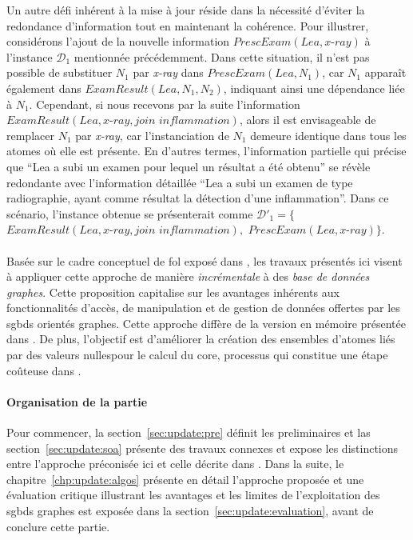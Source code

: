Un autre défi inhérent à la mise à jour réside dans la nécessité d'éviter la redondance d'information tout en maintenant la cohérence.
Pour illustrer, considérons l'ajout de la nouvelle information $PrescExam(Lea, \textit{x-ray})$ à l'instance $\mathcal{D}_1$ mentionnée précédemment.
Dans cette situation, il n'est pas possible de substituer $N_1$ par \textit{x-ray} dans $PrescExam(Lea, N_1)$, car $N_1$ apparaît également dans $ExamResult(Lea, N_1, N_2)$, indiquant ainsi une dépendance liée à $N_1$.
Cependant, si nous recevons par la suite l'information $ExamResult(Lea, \textit{x-ray}, \textit{join inflammation})$, alors il est envisageable de remplacer $N_1$ par \textit{x-ray}, car l'instanciation de $N_1$ demeure identique dans tous les atomes où elle est présente.
En d'autres termes, l'information partielle qui précise que \enquote{Lea a subi un examen pour lequel un résultat a été obtenu} se révèle redondante avec l'information détaillée \enquote{Lea a subi un examen de type radiographie, ayant comme résultat la détection d'une inflammation}.
Dans ce scénario, l'instance obtenue se présenterait comme $\mathcal{D}'_1 = \{$$ExamResult(Lea, \textit{x-ray}, \textit{join inflammation}),$ $PrescExam(Lea, \textit{x-ray})\}$.

\paragraph{}
Basée sur le cadre conceptuel de \gls{fol} exposé dans \cite{chabinConsistentUpdatingDatabases2020}, les travaux présentés ici visent à appliquer cette approche de manière \emph{incrémentale} à des \emph{base de données graphes}.
Cette proposition capitalise sur les avantages inhérents aux fonctionnalités d'accès, de manipulation et de gestion de données offertes par les \glspl{sgbd} orientés graphes.
Cette approche diffère de la version en mémoire présentée dans \cite{chabinConsistentUpdatingDatabases2020}.
De plus, l'objectif est d'améliorer la création des ensembles d'atomes liés par des valeurs nullespour le calcul du \gls{core}, processus qui constitue une étape coûteuse dans \cite{chabinConsistentUpdatingDatabases2020}.

\paragraph{Organisation de la partie}
Pour commencer, la section~\ref{sec:update:pre} définit les preliminaires et las section~\ref{sec:update:soa} présente des travaux connexes et expose les distinctions entre l'approche préconisée ici et celle décrite dans \cite{chabinConsistentUpdatingDatabases2020}.
Dans la suite, le chapitre~\ref{chp:update:algos} présente en détail l'approche proposée et une évaluation critique illustrant les avantages et les limites de l'exploitation des \glspl{sgbd} graphes est exposée dans la section~\ref{sec:update:evaluation}, avant de conclure cette partie.
